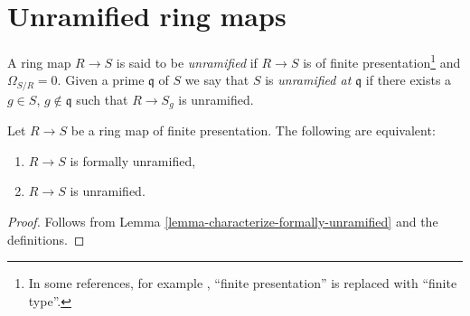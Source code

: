\section{Unramified ring maps}
\label{section-unramified}

\begin{definition}
\label{definition-unramified}
A ring map $R \to S$ is said to be
{\it unramified} if $R \to S$ is of finite presentation\footnote{In
some references, for example \cite{Henselian}, ``finite presentation''
is replaced with ``finite type''.} and
$\Omega_{S/R} = 0$.
Given a prime $\mathfrak q$ of $S$ we say that $S$ is {\it unramified
at $\mathfrak q$} if there exists a $g \in S$, $g \not \in \mathfrak q$
such that $R \to S_g$ is unramified.
\end{definition}

\begin{lemma}
\label{lemma-formally-unramified-unramified}
Let $R \to S$ be a ring map of finite presentation.
The following are equivalent:
\begin{enumerate}
\item $R \to S$ is formally unramified,
\item $R \to S$ is unramified.
\end{enumerate}
\end{lemma}

\begin{proof}
Follows from Lemma \ref{lemma-characterize-formally-unramified}
and the definitions.
\end{proof}

